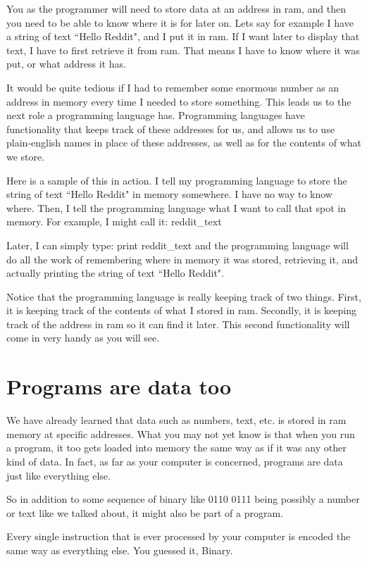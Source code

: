 \documentclass[a4paper,12pt]{article}
\let\stdsection\section
\renewcommand\section{\newpage\stdsection}
\begin{document}
You as the programmer will need to store data at an address in ram, and then you need to be able to know where it is for later on. Lets say for example I have a string of text ``Hello Reddit", and I put it in ram. If I want later to display that text, I have to first retrieve it from ram. That means I have to know where it was put, or what address it has.

It would be quite tedious if I had to remember some enormous number as an address in memory every time I needed to store something. This leads us to the next role a programming language has. Programming languages have functionality that keeps track of these addresses for us, and allows us to use plain-english names in place of these addresses, as well as for the contents of what we store.

Here is a sample of this in action. I tell my programming language to store the string of text ``Hello Reddit" in memory somewhere. I have no way to know where. Then, I tell the programming language what I want to call that spot in memory. For example, I might call it: reddit\_text

Later, I can simply type: print reddit\_text and the programming language will do all the work of remembering where in memory it was stored, retrieving it, and actually printing the string of text ``Hello Reddit".

Notice that the programming language is really keeping track of two things. First, it is keeping track of the contents of what I stored in ram. Secondly, it is keeping track of the address in ram so it can find it later. This second functionality will come in very handy as you will see.
\section{Programs are data too}
We have already learned that data such as numbers, text, etc. is stored in ram memory at specific addresses. What you may not yet know is that when you run a program, it too gets loaded into memory the same way as if it was any other kind of data. In fact, as far as your computer is concerned, programs are data just like everything else.

So in addition to some sequence of binary like 0110 0111 being possibly a number or text like we talked about, it might also be part of a program.

Every single instruction that is ever processed by your computer is encoded the same way as everything else. You guessed it, Binary.
\end{document}
